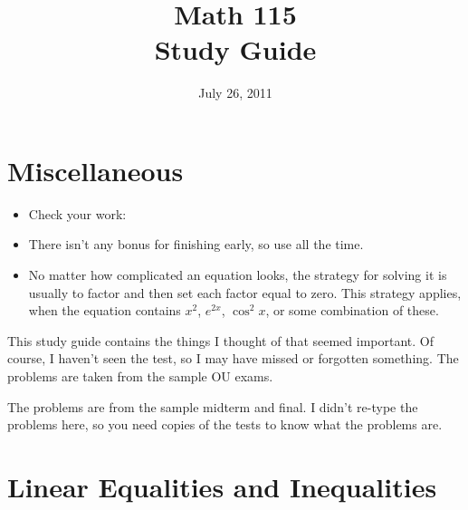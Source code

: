 \documentclass[fleqn,addpoints]{exam}
\title{Math 115 \\ Study Guide}
\date{July 26, 2011}
\begin{document}
\maketitle



\section{Miscellaneous}

\begin{itemize}
\item Check your work:
\item There isn't any bonus for finishing early, so use all the time.
\item No matter how complicated an equation looks, the strategy for solving it is usually to factor and then set each
  factor equal to zero.  This strategy applies, when the equation contains $x^2$, $e^{2x}$, $\cos^2 x$, or some
  combination of these.
\end{itemize}

This study guide contains the things I thought of that seemed important.  Of course, I haven't seen the test, so I may have
missed or forgotten something.  The problems are taken from the sample OU exams.

The problems are from the sample midterm and final.  I didn't re-type the problems here, so you need copies of the tests
to know what the problems are.  

\section{Linear Equalities and Inequalities}
\end{document}
